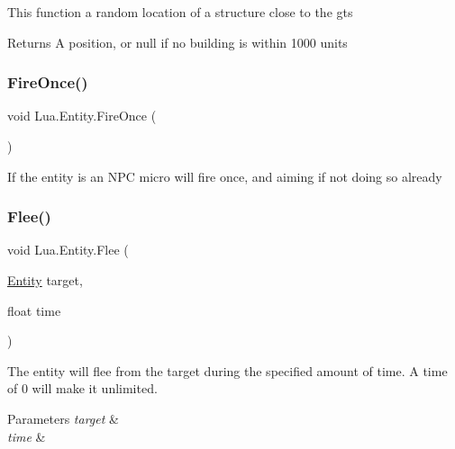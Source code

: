 This function a random location of a structure close to the gts 

\begin{DoxyReturn}{Returns}
A position, or null if no building is within 1000 units
\end{DoxyReturn}
\mbox{\label{class_lua_1_1_entity_a17d117771166d30924da118c1fed9968}} 
\subsubsection{\texorpdfstring{FireOnce()}{FireOnce()}}
{\footnotesize\ttfamily void Lua.\+Entity.\+Fire\+Once (\begin{DoxyParamCaption}{ }\end{DoxyParamCaption})}



If the entity is an N\+PC micro will fire once, and aiming if not doing so already 

\mbox{\label{class_lua_1_1_entity_af1290dfaf8e3da8c2adb7279359bf036}} 
\subsubsection{\texorpdfstring{Flee()}{Flee()}\hspace{0.1cm}{\footnotesize\ttfamily [1/2]}}
{\footnotesize\ttfamily void Lua.\+Entity.\+Flee (\begin{DoxyParamCaption}\item[{\mbox{\hyperlink{class_lua_1_1_entity}{Entity}}}]{target,  }\item[{float}]{time }\end{DoxyParamCaption})}



The entity will flee from the target during the specified amount of time. A time of 0 will make it unlimited. 


\begin{DoxyParams}{Parameters}
{\em target} & \\
\hline
{\em time} & \\
\hline
\end{DoxyParams}
\mbox{\label{class_lua_1_1_entity_a334e63b56e1c78e6dbebd4dd9c48a69e}} 
